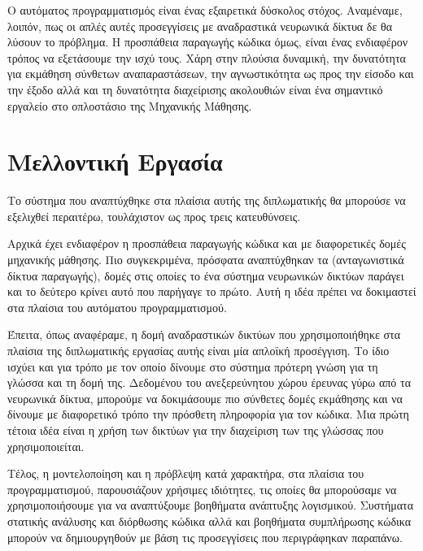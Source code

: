 Ο αυτόματος προγραμματισμός είναι ένας εξαιρετικά δύσκολος στόχος. 
Αναμέναμε, λοιπόν, πως οι απλές αυτές προσεγγίσεις με αναδραστικά νευρωνικά δίκτυα δε θα λύσουν το πρόβλημα.
Η προσπάθεια παραγωγής κώδικα όμως, είναι ένας ενδιαφέρον τρόπος να εξετάσουμε την ισχύ τους. 
Χάρη στην πλούσια δυναμική, την δυνατότητα για εκμάθηση σύνθετων αναπαραστάσεων, την αγνωστικότητα ως προς την είσοδο και την έξοδο αλλά και τη δυνατότητα διαχείρισης ακολουθιών είναι ένα σημαντικό εργαλείο στο οπλοστάσιο της Μηχανικής Μάθησης. 


\section{Μελλοντική Εργασία}

Το σύστημα που αναπτύχθηκε στα πλαίσια αυτής της διπλωματικής θα μπορούσε να εξελιχθεί περαιτέρω, τουλάχιστον ως προς τρεις κατευθύνσεις.

Αρχικά έχει ενδιαφέρον η προσπάθεια παραγωγής κώδικα και με διαφορετικές δομές μηχανικής μάθησης.
Πιο συγκεκριμένα, πρόσφατα αναπτύχθηκαν τα  \cite{Goodfellow2014} (ανταγωνιστικά δίκτυα παραγωγής), δομές στις οποίες το ένα σύστημα νευρωνικών δικτύων παράγει και το δεύτερο κρίνει αυτό που παρήγαγε το πρώτο.
Αυτή η ιδέα πρέπει να δοκιμαστεί στα πλαίσια του αυτόματου προγραμματισμού.

Έπειτα, όπως αναφέραμε, η δομή αναδραστικών δικτύων που χρησιμοποιήθηκε στα πλαίσια της διπλωματικής εργασίας αυτής είναι μία απλοϊκή προσέγγιση.
Το ίδιο ισχύει και για τρόπο με τον οποίο δίνουμε στο σύστημα πρότερη γνώση για τη γλώσσα και τη δομή της.
Δεδομένου του ανεξερεύνητου χώρου έρευνας γύρω από τα νευρωνικά δίκτυα, μπορούμε να δοκιμάσουμε πιο σύνθετες δομές εκμάθησης και να δίνουμε με διαφορετικό τρόπο την πρόσθετη πληροφορία για τον κώδικα.
Μια πρώτη τέτοια ιδέα είναι η χρήση των  δικτύων \cite{Tai2015} για την διαχείριση των  της γλώσσας που χρησιμοποιείται.

Τέλος, η μοντελοποίηση και η πρόβλεψη κατά χαρακτήρα, στα πλαίσια του προγραμματισμού, παρουσιάζουν χρήσιμες ιδιότητες, τις οποίες θα μπορούσαμε να χρησιμοποιήσουμε για να αναπτύξουμε βοηθήματα ανάπτυξης λογισμικού.
Συστήματα στατικής ανάλυσης και διόρθωσης κώδικα αλλά και βοηθήματα συμπλήρωσης κώδικα μπορούν να δημιουργηθούν με βάση τις προσεγγίσεις που περιγράφηκαν παραπάνω.